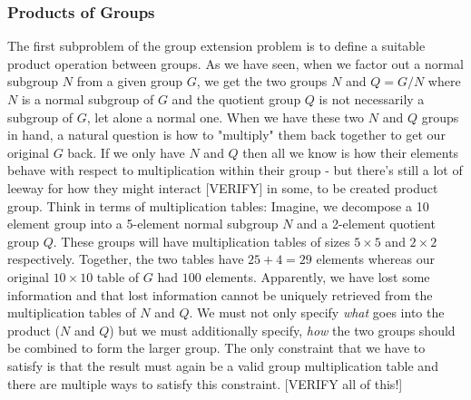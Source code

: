 
\subsubsection{Products of Groups}
The first subproblem of the group extension problem is to define a suitable product operation between groups. As we have seen, when we factor out a normal subgroup $N$ from a given group $G$, we get the two groups $N$ and $Q = G / N$ where $N$ is a normal subgroup of $G$ and the quotient group $Q$ is not necessarily a subgroup of $G$, let alone a normal one. When we have these two $N$ and $Q$ groups in hand, a natural question is how to "multiply" them back together to get our original $G$ back. If we only have $N$ and $Q$ then all we know is how their elements behave with respect to multiplication within their group - but there's still a lot of leeway for how they might interact [VERIFY] in some, to be created product group. Think in terms of multiplication tables: Imagine, we decompose a 10 element group into a 5-element normal subgroup $N$ and a 2-element quotient group $Q$. These groups will have multiplication tables of sizes $5 \times 5$ and $2 \times 2$ respectively. Together, the two tables have $25 + 4 = 29$ elements whereas our original $10 \times 10$ table of $G$ had $100$ elements. Apparently, we have lost some information and that lost information cannot be uniquely retrieved from the multiplication tables of $N$ and $Q$. We must not only specify \emph{what} goes into the product ($N$ and $Q$) but we must additionally specify, \emph{how} the two groups should be combined to form the larger group. The only constraint that we have to satisfy is that the result must again be a valid group multiplication table and there are multiple ways to satisfy this constraint. 
[VERIFY all of this!]




